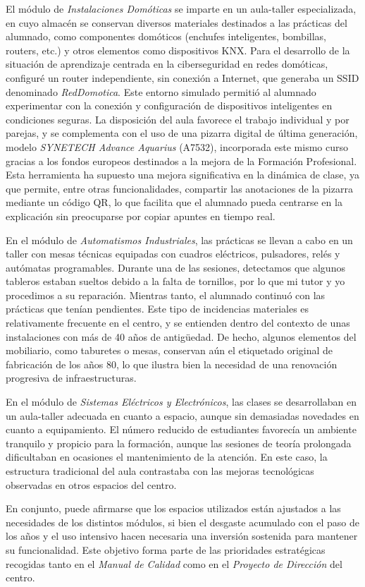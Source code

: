 El módulo de \textit{Instalaciones Domóticas} se imparte en un aula-taller especializada, en cuyo almacén se conservan diversos materiales destinados a las prácticas del alumnado, como componentes domóticos (enchufes inteligentes, bombillas, routers, etc.) y otros elementos como dispositivos KNX. Para el desarrollo de la situación de aprendizaje centrada en la ciberseguridad en redes domóticas, configuré un router independiente, sin conexión a Internet, que generaba un SSID denominado \textit{RedDomotica}. Este entorno simulado permitió al alumnado experimentar con la conexión y configuración de dispositivos inteligentes en condiciones seguras. La disposición del aula favorece el trabajo individual y por parejas, y se complementa con el uso de una pizarra digital de última generación, modelo \textit{SYNETECH Advance Aquarius} (A7532), incorporada este mismo curso gracias a los fondos europeos destinados a la mejora de la Formación Profesional. Esta herramienta ha supuesto una mejora significativa en la dinámica de clase, ya que permite, entre otras funcionalidades, compartir las anotaciones de la pizarra mediante un código QR, lo que facilita que el alumnado pueda centrarse en la explicación sin preocuparse por copiar apuntes en tiempo real.

En el módulo de \textit{Automatismos Industriales}, las prácticas se llevan a cabo en un taller con mesas técnicas equipadas con cuadros eléctricos, pulsadores, relés y autómatas programables. Durante una de las sesiones, detectamos que algunos tableros estaban sueltos debido a la falta de tornillos, por lo que mi tutor y yo procedimos a su reparación. Mientras tanto, el alumnado continuó con las prácticas que tenían pendientes. Este tipo de incidencias materiales es relativamente frecuente en el centro, y se entienden dentro del contexto de unas instalaciones con más de 40 años de antigüedad. De hecho, algunos elementos del mobiliario, como taburetes o mesas, conservan aún el etiquetado original de fabricación de los años 80, lo que ilustra bien la necesidad de una renovación progresiva de infraestructuras.

En el módulo de \textit{Sistemas Eléctricos y Electrónicos}, las clases se desarrollaban en un aula-taller adecuada en cuanto a espacio, aunque sin demasiadas novedades en cuanto a equipamiento. El número reducido de estudiantes favorecía un ambiente tranquilo y propicio para la formación, aunque las sesiones de teoría prolongada dificultaban en ocasiones el mantenimiento de la atención. En este caso, la estructura tradicional del aula contrastaba con las mejoras tecnológicas observadas en otros espacios del centro.

En conjunto, puede afirmarse que los espacios utilizados están ajustados a las necesidades de los distintos módulos, si bien el desgaste acumulado con el paso de los años y el uso intensivo hacen necesaria una inversión sostenida para mantener su funcionalidad. Este objetivo forma parte de las prioridades estratégicas recogidas tanto en el \textit{Manual de Calidad} como en el \textit{Proyecto de Dirección} del centro.
